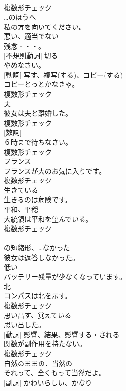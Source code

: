 \documentclass[8pt]{extreport}
\begin{document}
\begin{CJK}{UTF8}{min}
\\	複数形チェック
\\	[前置詞]	…のほうへ	
\\	私の方を向いてください。	
\\	[形容詞]	悪い、適当でない	
\\	残念・・・。	
\\	[動詞] [不規則動詞]	切る	
\\	やめなさい。	
\\	[名詞] [動詞]	写す、複写(する)、コピー(する)	
\\	コピーとっとかなきゃ。	
\\	複数形チェック
\\	[名詞]	夫	
\\	彼女は夫と離婚した。	
\\	複数形チェック
\\	[名詞] [数詞]	
\\	６時まで待ちなさい。	
\\	複数形チェック
\\	[名詞]	フランス	
\\	フランスが大のお気に入りです。	
\\	複数形チェック
\\	[形容詞]	生きている	
\\	生きるのは危険です。	
\\	[名詞]	平和、平穏	
\\	大統領は平和を望んでいる。	
\\	複数形チェック
\\	[短縮形]	
\\	の短縮形、…なかった	
\\	彼女は返答しなかった。	
\\	[形容詞]	低い	
\\	バッテリー残量が少なくなっています。	
\\	[名詞]	北	
\\	コンパスは北を示す。	
\\	複数形チェック
\\	[動詞]	思い出す、覚えている	
\\	思い出した。	
\\	[名詞] [動詞]	影響、結果、影響する・される	
\\	関数が副作用を持たない。	
\\	複数形チェック
\\	[形容詞]	自然のままの、当然の	
\\	それって、全くもって当然だよ。	
\\	[形容詞] [副詞]	かわいらしい、かなり	

\end{CJK}
\end{document}
